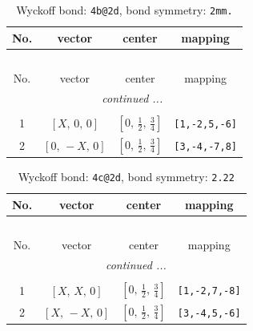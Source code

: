 \documentclass[fleqn,8pt]{jsarticle}
\begin{document}
\renewcommand{\arraystretch}{1.2}
\begin{longtable}{cccc}
\caption{Wyckoff bond: {\tt 4b@2d}, bond symmetry: {\tt 2mm.}}
 \\
 \hline \hline
No. & vector & center & mapping \\ \hline \endfirsthead

\multicolumn{3}{l}{\tablename\ \thetable{}} \\
 \hline \hline
No. & vector & center & mapping \\ \hline \endhead

 \hline \hline
\multicolumn{3}{r}{\footnotesize\it continued ...} \\ \endfoot

 \hline \hline
\multicolumn{3}{r}{} \\ \endlastfoot

1 & $\left[ X,\, 0,\, 0 \right]$ & $\left[ 0,\, \frac{1}{2},\, \frac{3}{4} \right]$ & {\tt [1,-2,5,-6]} \\ \hline
2 & $\left[ 0,\, - X,\, 0 \right]$ & $\left[ 0,\, \frac{1}{2},\, \frac{3}{4} \right]$ & {\tt [3,-4,-7,8]} \\
\end{longtable}
\renewcommand{\arraystretch}{1.2}
\begin{longtable}{cccc}
\caption{Wyckoff bond: {\tt 4c@2d}, bond symmetry: {\tt 2.22}}
 \\
 \hline \hline
No. & vector & center & mapping \\ \hline \endfirsthead

\multicolumn{3}{l}{\tablename\ \thetable{}} \\
 \hline \hline
No. & vector & center & mapping \\ \hline \endhead

 \hline \hline
\multicolumn{3}{r}{\footnotesize\it continued ...} \\ \endfoot

 \hline \hline
\multicolumn{3}{r}{} \\ \endlastfoot

1 & $\left[ X,\, X,\, 0 \right]$ & $\left[ 0,\, \frac{1}{2},\, \frac{3}{4} \right]$ & {\tt [1,-2,7,-8]} \\ \hline
2 & $\left[ X,\, - X,\, 0 \right]$ & $\left[ 0,\, \frac{1}{2},\, \frac{3}{4} \right]$ & {\tt [3,-4,5,-6]} \\
\end{longtable}
\renewcommand{\arraystretch}{1.2}
\end{document}
